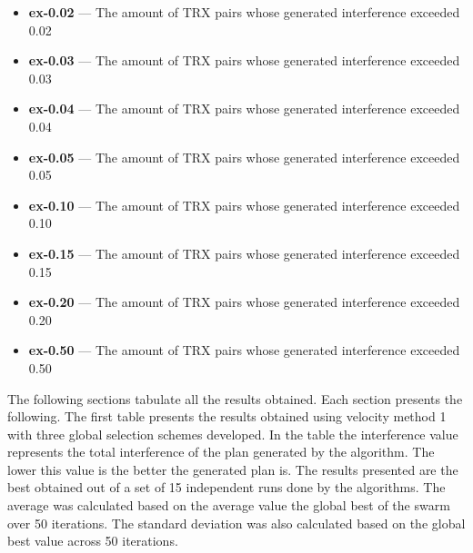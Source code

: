 \begin{itemize}
\begin{itemize}
                \item{\textbf{ex-0.02} }--- The amount of TRX pairs whose generated interference exceeded 0.02
                \item{\textbf{ex-0.03}} --- The amount of TRX pairs whose generated interference exceeded 0.03
                \item{\textbf{ex-0.04}} --- The amount of TRX pairs whose generated interference exceeded 0.04
                \item{\textbf{ex-0.05}} --- The amount of TRX pairs whose generated interference exceeded 0.05
                \item{\textbf{ex-0.10}} --- The amount of TRX pairs whose generated interference exceeded 0.10
                \item{\textbf{ex-0.15}} --- The amount of TRX pairs whose generated interference exceeded 0.15
                \item{\textbf{ex-0.20}} --- The amount of TRX pairs whose generated interference exceeded 0.20
                \item{\textbf{ex-0.50}} --- The amount of TRX pairs whose generated interference exceeded 0.50
            \end{itemize}
\end{itemize}

The following sections tabulate all the results obtained. Each section presents the following. The first table presents the results obtained using velocity method 1 with three global selection schemes developed. In the table the interference value represents the total interference of the plan generated by the algorithm. The lower this value is the better the generated plan is. The results presented are the best obtained out of a set of 15 independent runs done by the algorithms. The average was calculated based on the average value the global best of the swarm over 50 iterations. The standard deviation was also calculated based on the global best value across 50 iterations.
